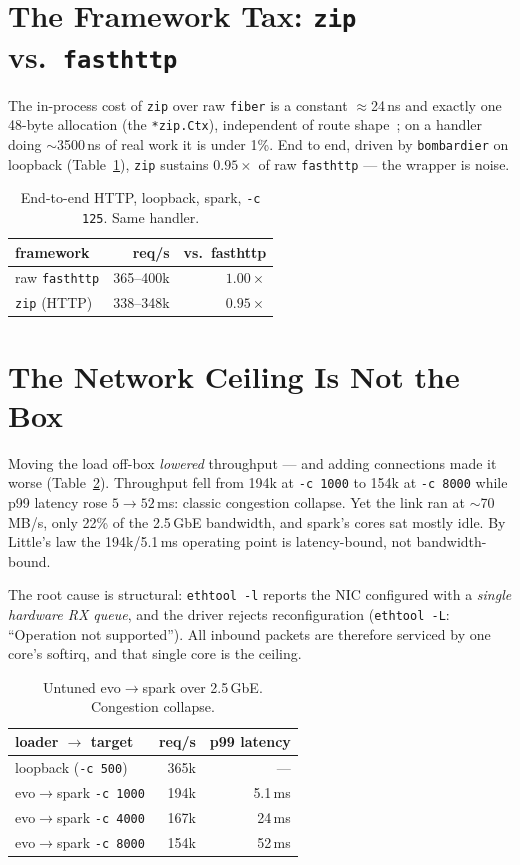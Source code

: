 \documentclass[11pt,twocolumn]{article}
\begin{document}
\section{The Framework Tax: \texttt{zip} vs.\ \texttt{fasthttp}}
The in-process cost of \texttt{zip} over raw \texttt{fiber} is a constant
$\approx$24\,ns and exactly one 48-byte allocation (the \texttt{*zip.Ctx}),
independent of route shape~\cite{zipbench}; on a handler doing $\sim$3500\,ns of
real work it is under 1\%. End to end, driven by \texttt{bombardier} on loopback
(Table~\ref{tab:framework}), \texttt{zip} sustains $0.95\times$ of raw
\texttt{fasthttp} --- the wrapper is noise.

\begin{table}[t]
\centering
\caption{End-to-end HTTP, loopback, spark, \texttt{-c 125}. Same handler.}
\label{tab:framework}
\begin{tabular}{lrr}
\toprule
framework & req/s & vs.\ fasthttp \\
\midrule
raw \texttt{fasthttp} & 365--400k & $1.00\times$ \\
\texttt{zip} (HTTP)   & 338--348k & $0.95\times$ \\
\bottomrule
\end{tabular}
\end{table}

\section{The Network Ceiling Is Not the Box}
\label{sec:ceiling}
Moving the load off-box \emph{lowered} throughput --- and adding connections made
it worse (Table~\ref{tab:ceiling}). Throughput fell from 194k at \texttt{-c 1000}
to 154k at \texttt{-c 8000} while p99 latency rose $5\to52$\,ms: classic
congestion collapse. Yet the link ran at $\sim$70\,MB/s, only 22\% of the
2.5\,GbE bandwidth, and spark's cores sat mostly idle. By Little's law the
194k/5.1\,ms operating point is latency-bound, not bandwidth-bound.

The root cause is structural: \texttt{ethtool -l} reports the NIC configured with
a \emph{single hardware RX queue}, and the driver rejects reconfiguration
(\texttt{ethtool -L}: ``Operation not supported''). All inbound packets are
therefore serviced by one core's softirq, and that single core is the ceiling.

\begin{table}[t]
\centering
\caption{Untuned evo$\to$spark over 2.5\,GbE. Congestion collapse.}
\label{tab:ceiling}
\begin{tabular}{lrr}
\toprule
loader $\to$ target & req/s & p99 latency \\
\midrule
loopback (\texttt{-c 500})   & 365k & --- \\
evo$\to$spark \texttt{-c 1000} & 194k & 5.1\,ms \\
evo$\to$spark \texttt{-c 4000} & 167k & 24\,ms \\
evo$\to$spark \texttt{-c 8000} & 154k & 52\,ms \\
\bottomrule
\end{tabular}
\end{table}
\end{document}
